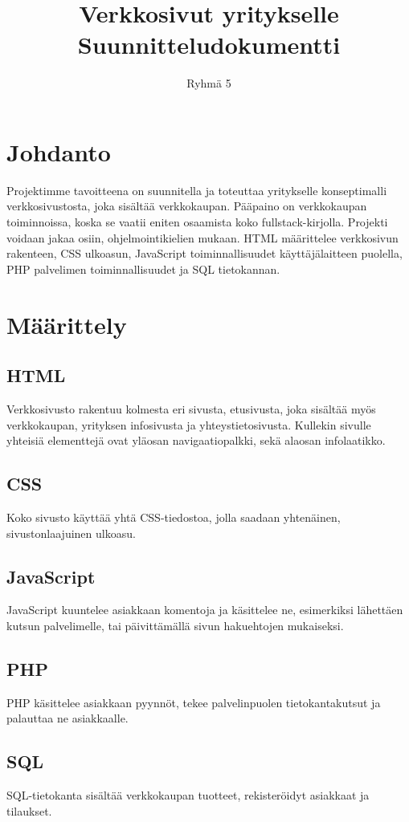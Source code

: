 \documentclass{article}
\author{Ryhmä 5}
\title{Verkkosivut yritykselle\\
\large Suunnitteludokumentti}
\begin{document}
\maketitle
\section{Johdanto}
Projektimme tavoitteena on suunnitella ja toteuttaa yritykselle konseptimalli verkkosivustosta, joka sisältää verkkokaupan. Pääpaino on verkkokaupan
toiminnoissa, koska se vaatii eniten osaamista koko fullstack-kirjolla. Projekti voidaan jakaa osiin, ohjelmointikielien mukaan. HTML määrittelee verkkosivun rakenteen,
CSS ulkoasun, JavaScript toiminnallisuudet käyttäjälaitteen puolella, PHP palvelimen toiminnallisuudet ja SQL tietokannan.

\section{Määrittely}
\subsection{HTML}
Verkkosivusto rakentuu kolmesta eri sivusta, etusivusta, joka sisältää myös verkkokaupan, yrityksen infosivusta ja yhteystietosivusta. Kullekin sivulle yhteisiä elementtejä ovat yläosan navigaatiopalkki, sekä alaosan infolaatikko.

\subsection{CSS}
Koko sivusto käyttää yhtä CSS-tiedostoa, jolla saadaan yhtenäinen, sivustonlaajuinen ulkoasu.

\subsection{JavaScript}
JavaScript kuuntelee asiakkaan komentoja ja käsittelee ne, esimerkiksi lähettäen kutsun palvelimelle, tai päivittämällä sivun hakuehtojen mukaiseksi.
\subsection{PHP}
PHP käsittelee asiakkaan pyynnöt, tekee palvelinpuolen tietokantakutsut ja palauttaa ne asiakkaalle.
\subsection{SQL}
SQL-tietokanta sisältää verkkokaupan tuotteet, rekisteröidyt asiakkaat ja tilaukset.
\end{document}
